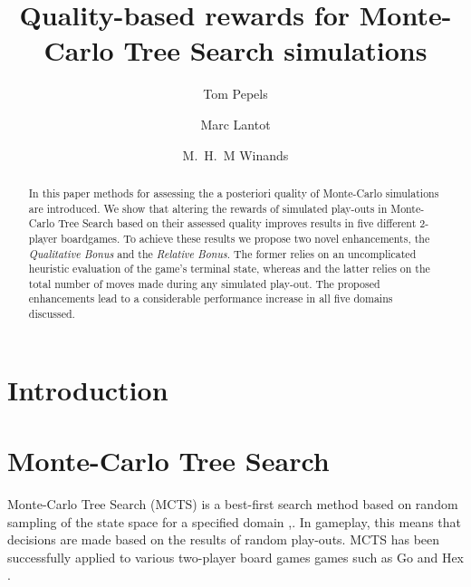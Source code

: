 \documentclass{ecai2010}
\begin{document}
\title{Quality-based rewards for Monte-Carlo Tree Search simulations}

\author{Tom Pepels \and Marc Lantot \and M.~H.~M Winands  }

\maketitle


\begin{abstract}
In this paper methods for assessing the a posteriori quality of Monte-Carlo simulations are introduced. We show that altering the rewards of simulated play-outs in Monte-Carlo Tree Search based on their assessed quality improves results in five different 2-player boardgames. To achieve these results we propose two novel enhancements, the \emph{Qualitative Bonus} and the \emph{Relative Bonus}. The former relies on an uncomplicated heuristic evaluation of the game's terminal state, whereas and the latter relies on the total number of moves made during any simulated play-out. The proposed enhancements lead to a considerable performance increase in all five domains discussed.
\end{abstract}

\section{Introduction}
\label{sec:intro}
\section{Monte-Carlo Tree Search}
\label{sec:mcts}
Monte-Carlo Tree Search (MCTS) is a best-first search method based on random sampling of the state space for a specified domain \cite{kocsis2006bandit},\cite{coulom2007efficient}. In gameplay, this means that decisions are made based on the results of random play-outs. MCTS has been successfully applied to various two-player board games games such as Go \cite{lee2010current} and Hex \cite{arneson2010monte}.
\end{document}
